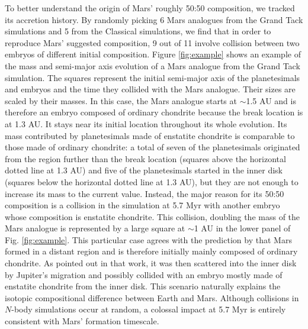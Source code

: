 \documentclass{aa}
\begin{document}
To better understand the origin of Mars’ roughly 50:50 composition, we tracked its accretion history. By randomly picking 6 Mars analogues from the Grand Tack simulations and 5 from the Classical simulations, we find that in order to reproduce Mars’ suggested composition, 9 out of 11 involve collision between two embryos of different initial composition. Figure \ref{fig:example} shows an example of the mass and semi-major axis evolution of a Mars analogue from the Grand Tack simulation. The squares represent the initial semi-major axis of the planetesimals and embryos and the time they collided with the Mars analogue. Their sizes are scaled by their masses. In this case, the Mars analogue starts at $\sim$1.5 AU and is therefore an embryo composed of ordinary chondrite because the break location is at 1.3 AU. It stays near its initial location throughout its whole evolution. Its mass contributed by planetesimals made of enstatite chondrite is comparable to those made of ordinary chondrite: a total of seven of the planetesimals originated from the region further than the break location (squares above the horizontal dotted line at 1.3 AU) and five of the planetesimals started in the inner disk (squares below the horizontal dotted line at 1.3 AU), but they are not enough to increase its mass to the current value. Instead, the major reason for its 50:50 composition is a collision in the simulation at 5.7 Myr with another embryo whose composition is enstatite chondrite. This collision, doubling the mass of the Mars analogue is represented by a large square at $\sim$1 AU in the lower panel of Fig. \ref{fig:example}. This particular case agrees with the prediction by \cite{brasser2017cool} that Mars formed in a distant region and is therefore initially mainly composed of ordinary chondrite. As pointed out in that work, it was then scattered into the inner disk by Jupiter’s migration and possibly collided with an embryo mostly made of enstatite chondrite from the inner disk. This scenario naturally explains the isotopic compositional difference between Earth and Mars. Although collisions in $N$-body simulations occur at random, a colossal impact at 5.7 Myr is entirely consistent with Mars’ formation timescale.


\begin{figure*}

\caption{The evolution of mass and semi-major axis, respectively, of a Mars analogue (red solid lines in both panels) with a final 50:50 composition in the Grand Tack simulation with initial equal mass embryos. The squares in the lower panel represent the initial semi-major axes and the collision time with the Mars analogue of the planetesimals (smaller squares) and embryos (larger square). The black dotted horizontal line at 1.3 AU in the lower panel is the break location of the initial disk.}   

\label{fig:example}

\end{figure*}
\end{document}

